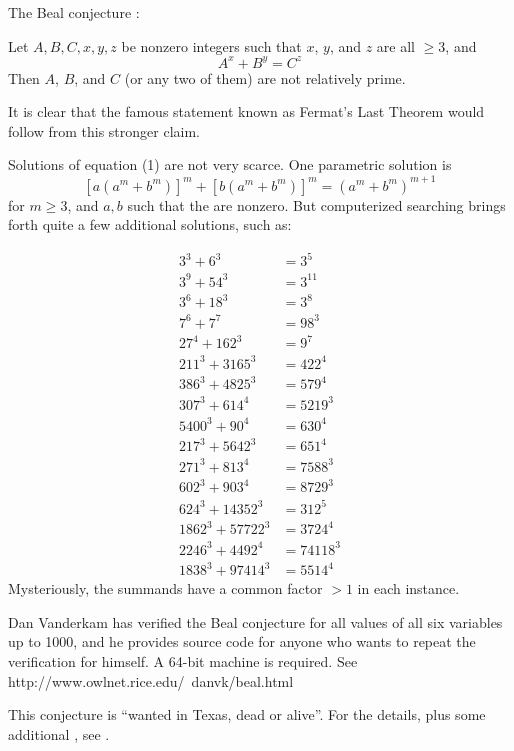 \documentclass[12pt]{article}
\begin{document}
The Beal conjecture :

Let $A,B,C,x,y,z$ be nonzero integers such that $x$, $y$, and $z$ are all
$\ge 3$, and \begin{equation}A^x+B^y=C^z\end{equation}
Then $A$, $B$, and $C$ (or any two of them) are not relatively prime.

It is clear that the famous statement known as Fermat's Last Theorem
would follow from this stronger claim.

Solutions of equation (1) are not very scarce. One parametric solution is
$$[a(a^m + b^m)]^m + [b(a^m + b^m)]^m = (a^m + b^m)^{m+1}$$
for $m\ge 3$, and $a,b$ such that the  are nonzero.
But computerized searching brings
forth quite a few additional solutions, such as:

\begin{align*}
3^3 + 6^3 &= 3^5 \\
3^9 + 54^3 &= 3^{11} \\
3^6 + 18^3 &= 3^8 \\
7^6 + 7^7 &= 98^3 \\
27^4 + 162^3 &= 9^7 \\
211^3 + 3165^3 &= 422^4 \\
386^3 + 4825^3 &= 579^4 \\
307^3 + 614^4 &= 5219^3 \\
5400^3 + 90^4 &= 630^4 \\
217^3 + 5642^3 &= 651^4 \\
271^3 + 813^4 &= 7588^3 \\
602^3 + 903^4 &= 8729^3 \\
624^3 + 14352^3 &= 312^5 \\
1862^3 + 57722^3 &= 3724^4 \\
2246^3 + 4492^4 &= 74118^3 \\
1838^3 + 97414^3 &= 5514^4
\end{align*}
Mysteriously, the summands have a common factor $>1$ in each instance.

Dan Vanderkam has verified the Beal conjecture for all values of all six variables up to 1000, and he provides source code for anyone who wants to repeat the verification for himself. A 64-bit machine is required. See http://www.owlnet.rice.edu/~danvk/beal.html

This conjecture is ``wanted in Texas, dead or alive''. For the details,
plus some additional , see
.
\end{document}

